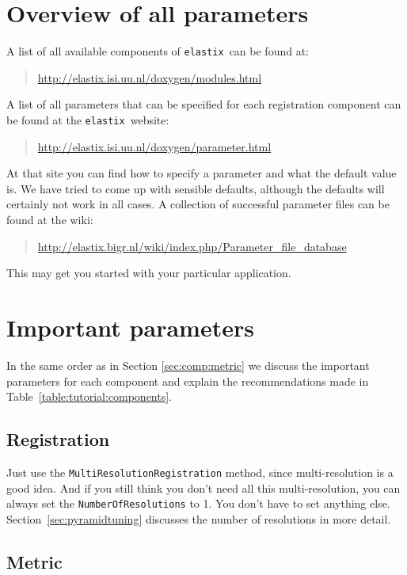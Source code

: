 \documentclass[]{report}
\newcommand{\elastix}{\texttt{elastix}}
\begin{document}
\section{Overview of all parameters}

A list of all available components of \elastix\ can be found at:
\begin{quote}
\url{http://elastix.isi.uu.nl/doxygen/modules.html}
\end{quote}
A list of all parameters that can be specified for each registration
component can be found at the \elastix\ website:
\begin{quote}
\url{http://elastix.isi.uu.nl/doxygen/parameter.html}
\end{quote}
At that site you can find how to specify a parameter and what the
default value is. We have tried to come up with sensible defaults,
although the defaults will certainly not work in all cases. A
collection of successful parameter files can be found at the wiki:
\begin{quote}
\url{http://elastix.bigr.nl/wiki/index.php/Parameter_file_database}
\end{quote}
This may get you started with your particular application.

\section{Important parameters}\label{sec:Tutorial:importantparam}

In the same order as in Section \ref{sec:comp:metric} we discuss
the important parameters for each component and explain the
recommendations made in Table~\ref{table:tutorial:components}.

\subsection{Registration}\label{sec:registrationtuning}

Just use the \texttt{MultiResolutionRegistration} method, since
multi-resolution is a good idea. And if you still think you don't
need all this multi-resolution, you can always set the
\texttt{NumberOfResolutions} to 1. You don't have to set anything
else. Section~\ref{sec:pyramidtuning} discusses the number of
resolutions in more detail.

\subsection{Metric}
\end{document}
